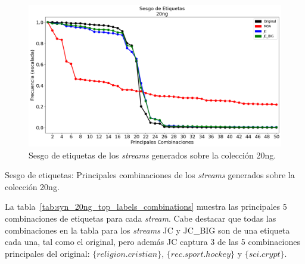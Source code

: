\bigskip
\begin{figure}[htbp]
	\includegraphics[width=\linewidth]{figures/experiments/syn/20ng/label_skew.png}
	\caption{Sesgo de etiquetas de los \textit{streams} generados sobre la colección
		20ng.}
	\label{fig:syn_20ng_label_skew}
\end{figure}

\bigskip

\begin{table}[htbp]
	\centering
	\begin{adjustbox}{max width=\textwidth}
		
	\end{adjustbox}
	\caption{Sesgo de etiquetas: Principales combinaciones de los
		\textit{streams} generados sobre la colección 20ng.}
	\label{tab:syn_20ng_top_labels_combinations}
\end{table}
\bigskip

La tabla~\ref{tab:syn_20ng_top_labels_combinations} muestra las principales 5
combinaciones de etiquetas para cada \textit{stream}. Cabe destacar que todas
las combinaciones en la tabla para los \textit{streams} JC y JC\_BIG son de una
etiqueta cada una, tal como el original, pero además JC captura 3 de las 5
combinaciones principales del original: $\{religion.cristian\}$,
$\{rec.sport.hockey\}$ y $\{sci.crypt\}$.


